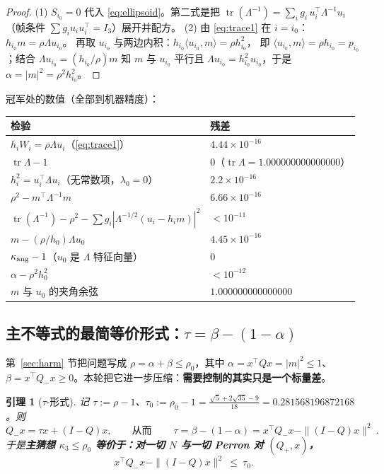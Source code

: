 \documentclass[UTF8,11pt]{ctexart}
\newtheorem{lemma}[theorem]{引理}
\theoremstyle{definition}
\newcommand{\Lam}{\Lambda}
\newcommand{\tr}{\operatorname{tr}}
\begin{document}
\begin{proof}
(1) $S_{i_0}=0$ 代入 \eqref{eq:ellipsoid}。第二式是把 $\tr(\Lam^{-1})=\sum_ig_i\,u_i^\top\Lam^{-1}u_i$
（帧条件 $\sum g_iu_iu_i^\top=I_3$）展开并配方。
(2) 由 \eqref{eq:trace1} 在 $i=i_0$：$h_{i_0}m=\rho\Lam u_{i_0}$。
再取 $u_{i_0}$ 与两边内积：$h_{i_0}\langle u_{i_0},m\rangle=\rho h_{i_0}^2$，
即 $\langle u_{i_0},m\rangle=\rho h_{i_0}=p_{i_0}$；结合 $\Lam u_{i_0}=(h_{i_0}/\rho)m$ 知
$m$ 与 $u_{i_0}$ 平行且 $\Lam u_{i_0}=h_{i_0}^2u_{i_0}$，于是 $\alpha=|m|^2=\rho^2h_{i_0}^2$。
\end{proof}

冠军处的数值（全部到机器精度）：
\begin{center}\small
\begin{tabular}{ll}
\hline
检验 & 残差 \\
\hline
$h_iW_i=\rho\Lam u_i$（\eqref{eq:trace1}） & $4.44\times10^{-16}$ \\
$\tr\Lam-1$ & $0$（$\tr\Lam=1.000000000000000$） \\
$h_i^2=u_i^\top\!\Lam u_i$（无常数项，$\lambda_0=0$） & $2.2\times10^{-16}$ \\
$\rho^2-m^\top\Lam^{-1}m$ & $6.66\times10^{-16}$ \\
$\tr(\Lam^{-1})-\rho^2-\sum g_i|\Lam^{-1/2}(u_i-h_im)|^2$ & $<10^{-11}$ \\
$m-(\rho/h_0)\Lam u_0$ & $4.45\times10^{-16}$ \\
$\kappa_{\rm ang}-1$（$u_0$ 是 $\Lam$ 特征向量） & $0$ \\
$\alpha-\rho^2h_0^2$ & $<10^{-12}$ \\
$m$ 与 $u_0$ 的夹角余弦 & $1.000000000000000$ \\
\hline
\end{tabular}
\end{center}


\subsection{主不等式的最简等价形式：$\tau=\beta-(1-\alpha)$}\label{sec:r17:tau}

第~\ref{sec:harm} 节把问题写成 $\rho=\alpha+\beta\le\rho_0$，其中 $\alpha=x^\top Qx=|m|^2\le1$、
$\beta=x^\top Q_-x\ge0$。本轮把它进一步压缩：\textbf{需要控制的其实只是一个标量差}。

\begin{lemma}[$\tau$-形式]\label{lem:tauform}
记 $\tau:=\rho-1$、$\tau_0:=\rho_0-1=\frac{\sqrt5+2\sqrt{35}-9}{18}=0.281568196872168$。则
\begin{equation}\label{eq:tauform}
Q_-x=\tau x+(I-Q)x,\qquad\text{从而}\qquad
\boxed{\ \tau=\beta-(1-\alpha)=x^\top Q_-x-\|(I-Q)x\|^2\ } .
\end{equation}
于是\textbf{主猜想 $\kappa_3\le\rho_0$ 等价于：对一切 $N$ 与一切 Perron 对 $(Q_+,x)$，}
\begin{equation}\label{eq:maincrux}
x^\top Q_-x-\|(I-Q)x\|^2\ \le\ \tau_0 .
\end{equation}
\end{lemma}
\end{document}
